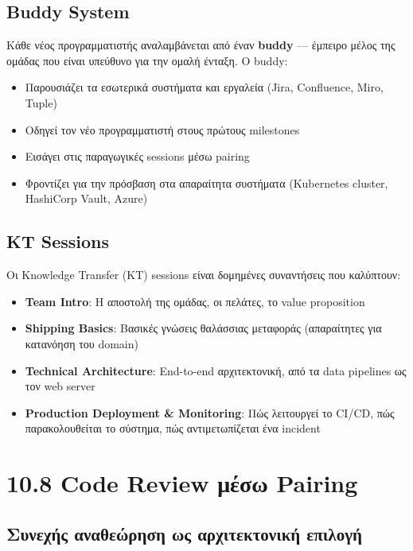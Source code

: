 \subsection{Buddy System}\label{buddy-system}

Κάθε νέος προγραμματιστής αναλαμβάνεται από έναν \textbf{buddy} ---
έμπειρο μέλος της ομάδας που είναι υπεύθυνο για την ομαλή ένταξη. Ο
buddy:

\begin{itemize}
\tightlist
\item
  Παρουσιάζει τα εσωτερικά συστήματα και εργαλεία (Jira, Confluence,
  Miro, Tuple)
\item
  Οδηγεί τον νέο προγραμματιστή στους πρώτους milestones
\item
  Εισάγει στις παραγωγικές sessions μέσω pairing
\item
  Φροντίζει για την πρόσβαση στα απαραίτητα συστήματα (Kubernetes
  cluster, HashiCorp Vault, Azure)
\end{itemize}

\subsection{KT Sessions}\label{kt-sessions}

Οι Knowledge Transfer (KT) sessions είναι δομημένες συναντήσεις που
καλύπτουν:

\begin{itemize}
\tightlist
\item
  \textbf{Team Intro}: Η αποστολή της ομάδας, οι πελάτες, το value
  proposition
\item
  \textbf{Shipping Basics}: Βασικές γνώσεις θαλάσσιας μεταφοράς
  (απαραίτητες για κατανόηση του domain)
\item
  \textbf{Technical Architecture}: End-to-end αρχιτεκτονική, από τα data
  pipelines ως τον web server
\item
  \textbf{Production Deployment \& Monitoring}: Πώς λειτουργεί το CI/CD,
  πώς παρακολουθείται το σύστημα, πώς αντιμετωπίζεται ένα incident
\end{itemize}

\section{10.8 Code Review μέσω
Pairing}\label{code-review-ux3bcux3adux3c3ux3c9-pairing}

\subsection{Συνεχής αναθεώρηση ως αρχιτεκτονική
επιλογή}\label{ux3c3ux3c5ux3bdux3b5ux3c7ux3aeux3c2-ux3b1ux3bdux3b1ux3b8ux3b5ux3ceux3c1ux3b7ux3c3ux3b7-ux3c9ux3c2-ux3b1ux3c1ux3c7ux3b9ux3c4ux3b5ux3baux3c4ux3bfux3bdux3b9ux3baux3ae-ux3b5ux3c0ux3b9ux3bbux3bfux3b3ux3ae}

